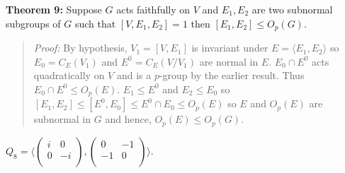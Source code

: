 {\bf Theorem 9:} Suppose $G$ acts faithfully on $V$ and $E_1 , E_2$ are
two subnormal subgroups of $G$ 
such that $[V,E_1 , E_2 ]=1$ then $[E_1 , E_2 ] \le O_p (G)$.
\begin{quote}
\emph{Proof:}  
By hypothesis, $V_1= [V, E_1]$ is invariant under $E= \langle E_1 , E_2 \rangle $ so
$E_0 = C_E(V_1)$ and $E^0= C_E(V/V_1)$ are normal in $E$.
$E_0 \cap E^0$ acts quadratically on $V$ and is a $p$-group by the earlier result.
Thus $E_0 \cap E^0 \le O_p(E)$.
$E_1 \le E^0$ and
$E_2 \le E_0$ so $[E_1 , E_2 ] \le [E^0 , E_0] \le E^0 \cap E_0 \le O_p(E)$ so
$E$ and $O_p(E)$ are subnormal in $G$ and hence, $O_p(E) \le O_p(G)$.
\end{quote}
$Q_8= \langle
\left(
\begin{array}{cc}
i & 0 \\
0 & -i \\
\end{array}
\right),
\left( 
\begin{array}{cc}
0 & -1 \\
-1 & 0 \\
\end{array}
\right) \rangle $.
